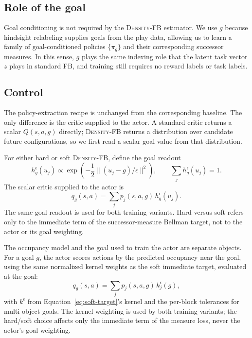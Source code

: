 \documentclass{article}
\newcommand{\DensityFB}{\textsc{Density-FB}}
\begin{document}
\subsection{Role of the goal}

Goal conditioning is not required by the \DensityFB{} estimator.
We use $g$ because hindsight relabeling supplies goals from the play data, allowing us to learn a family of goal-conditioned policies $\{\pi_g\}$ and their corresponding successor measures.
In this sense, $g$ plays the same indexing role that the latent task vector $z$ plays in standard FB, and training still requires no reward labels or task labels.

\subsection{Control}
\label{sec:method-control}

The policy-extraction recipe is unchanged from the corresponding baseline.
The only difference is the critic supplied to the actor.
A standard critic returns a scalar $Q(s,a,g)$ directly; \DensityFB{} returns a distribution over candidate future configurations, so we first read a scalar
goal value from that distribution.

For either hard or soft \DensityFB{}, define the goal readout
\begin{equation} 
    h_g^\epsilon(u_j) \propto \exp\!\left( -\frac12 \|(u_j-g)/\epsilon\|^2 \right), \qquad \sum_j h_g^\epsilon(u_j)=1.
\end{equation}
The scalar critic supplied to the actor is
\begin{equation}
    q_g(s,a) = \sum_j p_j(s,a,g)\, h_g^\epsilon(u_j).
\end{equation}
The same goal readout is used for both training variants.
Hard versus soft refers only to the immediate term of the successor-measure
Bellman target, not to the actor or its goal weighting.

The occupancy model and the goal used to train the actor are separate objects.
For a goal $g$, the actor scores actions by the predicted occupancy near the goal, using the same normalized kernel weights as the soft immediate target, evaluated at the goal:
\begin{equation}
\label{eq:goal-readout}
q_g(s,a) = \sum_j p_j(s,a,g)\, k_j^\epsilon(g),
\end{equation}
with $k^\epsilon$ from Equation~\ref{eq:soft-target}'s kernel and the per-block tolerances for multi-object goals.
The kernel weighting is used by both training variants; the hard/soft choice affects only the immediate term of the measure loss, never the actor's goal weighting.
\end{document}
